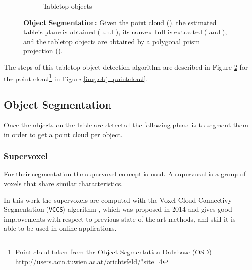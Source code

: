 \begin{figure}[htp]
\begin{subfigure}[t]{0.32\textwidth}
\caption{Tabletop objects}\label{img:obj_tabletop_objects_results}
\end{subfigure}
\caption{\textbf{Object Segmentation:} Given the point cloud (), the estimated table's plane is obtained ( and ), its convex hull is extracted ( and ), and the tabletop objects are obtained by a polygonal prism projection ().}
\label{img:obj_tabletop_objects}
\end{figure}

The steps of this tabletop object detection algorithm are described in Figure \ref{img:obj_tabletop_objects}   for the point cloud\footnote{Point cloud taken from the Object Segmentation Database (OSD) \href{http://users.acin.tuwien.ac.at/arichtsfeld/?site=4}{http://users.acin.tuwien.ac.at/arichtsfeld/?site=4}} in Figure \ref{img:obj_pointcloud}.

\subsection{Object Segmentation}
\label{sec:obj_seg}
Once the objects on the table are detected the following phase is to segment them in order to get a point cloud per object.

\subsubsection{Supervoxel}

For their segmentation the supervoxel concept is used. A supervoxel is a group of voxels that share similar characteristics. 

In this work the supervoxels are computed with the Voxel Cloud Connectivy Segmentation (\texttt{VCCS}) algorithm \cite{Papon13CVPR}, which was proposed in 2014 and gives good improvements with respect to previous state of the art methods, and still it is able to be used in online applications. 


